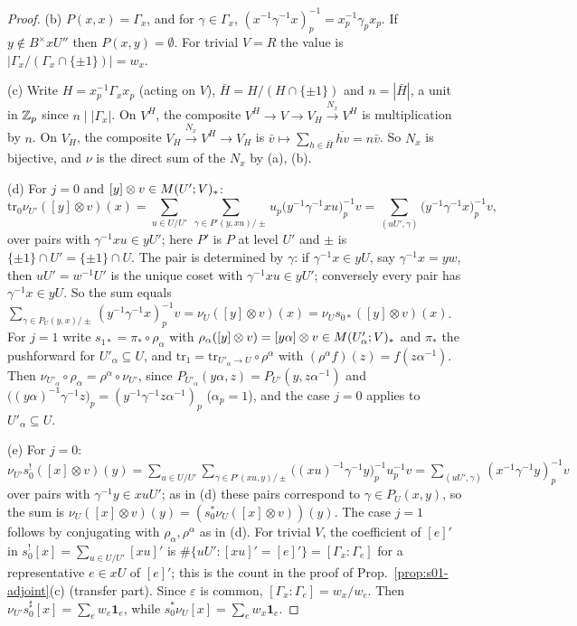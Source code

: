 \begin{proof}
(b) $P(x,x)=\Gamma_x$, and for $\gamma\in\Gamma_x$, $(x^{-1}\gamma^{-1}x)_p^{-1}=x_p^{-1}\gamma_px_p$. If $y\notin B^\times xU''$ then $P(x,y)=\emptyset$. For trivial
$V=R$ the value is $|\Gamma_x/(\Gamma_x\cap\{\pm1\})|=w_x$.

(c) Write $H=x_p^{-1}\Gamma_xx_p$ (acting on $V$), $\bar H=H/(H\cap\{\pm1\})$ and $n=|\bar H|$, a unit in $\mathbb{Z}_p$ since $n\mid|\Gamma_x|$. On $V^H$, the
composite $V^H\to V\to V_H\xrightarrow{N_x}V^H$ is multiplication by $n$. On $V_H$, the composite $V_H\xrightarrow{N_x}V^H\to V_H$ is
$\bar v\mapsto\sum_{h\in\bar H}\overline{hv}=n\bar v$. So $N_x$ is bijective, and $\nu$ is the direct sum of the $N_x$ by (a), (b).

(d) For $j=0$ and $[y]\otimes v\in M(U';V)_*$:
\[\mathrm{tr}_0\nu_{U'}([y]\otimes v)(x)=\sum_{u\in U/U'}\ \sum_{\gamma\in P'(y,xu)/\pm}u_p\big(y^{-1}\gamma^{-1}xu\big)_p^{-1}v
=\sum_{(uU',\gamma)}\big(y^{-1}\gamma^{-1}x\big)_p^{-1}v ,\]
over pairs with $\gamma^{-1}xu\in yU'$; here $P'$ is $P$ at level $U'$ and $\pm$ is $\{\pm1\}\cap U'=\{\pm1\}\cap U$. The pair is determined by $\gamma$: if
$\gamma^{-1}x\in yU$, say $\gamma^{-1}x=yw$, then $uU'=w^{-1}U'$ is the unique coset with $\gamma^{-1}xu\in yU'$; conversely every pair has
$\gamma^{-1}x\in yU$. So the sum equals $\sum_{\gamma\in P_U(y,x)/\pm}(y^{-1}\gamma^{-1}x)_p^{-1}v=\nu_U([y]\otimes v)(x)=\nu_Us_{0*}([y]\otimes v)(x)$.
For $j=1$ write $s_{1*}=\pi_*\circ\rho_\alpha$ with $\rho_\alpha([y]\otimes v)=[y\alpha]\otimes v\in M(U'_\alpha;V)_*$ and $\pi_*$ the pushforward for
$U'_\alpha\subseteq U$, and $\mathrm{tr}_1=\mathrm{tr}_{U'_\alpha\to U}\circ\rho^\alpha$ with $(\rho^\alpha f)(z)=f(z\alpha^{-1})$. Then $\nu_{U'_\alpha}\circ\rho_\alpha=\rho^\alpha\circ\nu_{U'}$, since
$P_{U'_\alpha}(y\alpha,z)=P_{U'}(y,z\alpha^{-1})$ and $\big((y\alpha)^{-1}\gamma^{-1}z\big)_p=(y^{-1}\gamma^{-1}z\alpha^{-1})_p$ ($\alpha_p=1$), and the case $j=0$ applies to
$U'_\alpha\subseteq U$.

(e) For $j=0$: $\nu_{U'}s_0^!([x]\otimes v)(y)=\sum_{u\in U/U'}\sum_{\gamma\in P'(xu,y)/\pm}\big((xu)^{-1}\gamma^{-1}y\big)_p^{-1}u_p^{-1}v=\sum_{(uU',\gamma)}(x^{-1}\gamma^{-1}y)_p^{-1}v$
over pairs with $\gamma^{-1}y\in xuU'$; as in (d) these pairs correspond to $\gamma\in P_U(x,y)$, so the sum is $\nu_U([x]\otimes v)(y)=(s_0^*\nu_U([x]\otimes v))(y)$.
The case $j=1$ follows by conjugating with $\rho_\alpha,\rho^\alpha$ as in (d). For trivial $V$, the coefficient of $[e]'$ in $s_0^![x]=\sum_{u\in U/U'}[xu]'$
is $\#\{uU':[xu]'=[e]'\}=[\Gamma_x:\Gamma_e]$ for a representative $e\in xU$ of $[e]'$; this is the count in the proof of Prop.~\ref{prop:s01-adjoint}(c)
(transfer part). Since $\varepsilon$ is common, $[\Gamma_x:\Gamma_e]=w_x/w_e$. Then $\nu_{U'}s_0^\sharp[x]=\sum_ew_e\mathbf 1_e$, while
$s_0^*\nu_U[x]=\sum_ew_x\mathbf 1_e$.


\end{proof}
